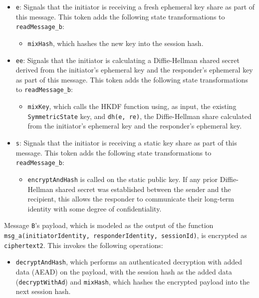 \begin{itemize}

\item \texttt{e}: Signals that the initiator is receiving a fresh ephemeral key share as part of this message. This token adds the following state transformations to \texttt{readMessage\_b}:
\begin{itemize}

\item \texttt{mixHash}, which hashes the new key into the session hash.
\end{itemize}


\item \texttt{ee}: Signals that the initiator is calculating a Diffie-Hellman shared secret derived from the initiator's ephemeral key and the responder's ephemeral key as part of this message. This token adds the following state transformations to \texttt{readMessage\_b}:
\begin{itemize}

\item \texttt{mixKey}, which calls the HKDF function using, as input, the existing \texttt{SymmetricState} key, and \texttt{dh(e, re)}, the Diffie-Hellman share calculated from the initiator's ephemeral key and the responder's ephemeral key.
\end{itemize}


\item \texttt{s}: Signals that the initiator is receiving a static key share as part of this message. This token adds the following state transformations to \texttt{readMessage\_b}:
\begin{itemize}

\item \texttt{encryptAndHash} is called on the static public key. If any prior Diffie-Hellman shared secret was established between the sender and the recipient, this allows the responder to communicate their long-term identity with some degree of confidentiality.
\end{itemize}


\end{itemize}
Message \texttt{B}'s payload, which is modeled as the output of the function \texttt{msg\_a(initiatorIdentity, responderIdentity, sessionId)}, is encrypted as \texttt{ciphertext2}. This invokes the following operations:


\begin{itemize}

\item \texttt{decryptAndHash}, which performs an authenticated decryption with added data (AEAD) on the payload, with the session hash as the added data (\texttt{decryptWithAd}) and \texttt{mixHash}, which hashes the encrypted payload into the next session hash.

\end{itemize}
